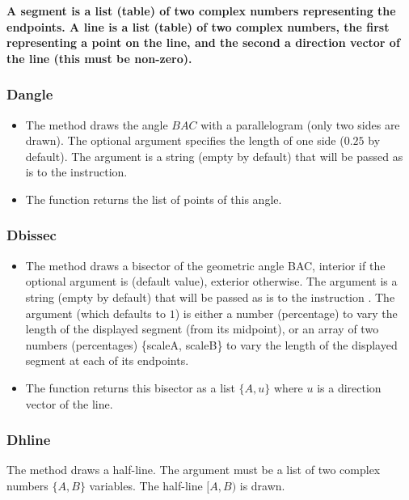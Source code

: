 \textbf{A segment is a list (table) of two complex numbers representing the endpoints. A line is a list (table) of two complex numbers, the first representing a point on the line, and the second a direction vector of the line (this must be non-zero).}

\subsubsection{Dangle}
\begin{itemize}
    \item The  method draws the angle \(BAC\) with a parallelogram (only two sides are drawn). The optional argument  specifies the length of one side ($0.25$ by default). The argument  is a string (empty by default) that will be passed as is to the \drawcmd instruction.
     \item The function  returns the list of points of this angle.
\end{itemize}

\newcommand*{\arguScale}{%
The argument \argu{scale} (which defaults to $1$) is either a number (percentage) to vary the length of the displayed segment (from its midpoint), or an array of two numbers (percentages) \{scaleA, scaleB\} to vary the length of the displayed segment at each of its endpoints.
}%

\subsubsection{Dbissec}
\begin{itemize}
    \item The method  draws a bisector of the geometric angle BAC, interior if the optional argument  is \true (default value), exterior otherwise. The argument  is a string (empty by default) that will be passed as is to the instruction \drawcmd. \arguScale
    \item The function  returns this bisector as a list $\{A,u\}$ where $u$ is a direction vector of the line. 
\end{itemize}

\subsubsection{Dhline}
The method  draws a half-line. The argument  must be a list of two complex numbers $\{A,B\}$ variables. The half-line $[A,B)$ is drawn.

